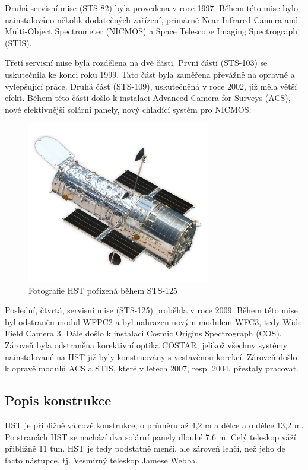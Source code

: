 \documentclass[a4paper,11pt]{article}
\begin{document}
Druhá servisní mise (STS-82) byla provedena v roce 1997. Během této mise bylo nainstalováno několik dodatečných zařízení, primárně Near Infrared Camera and Multi-Object Spectrometer (NICMOS) a Space Telescope Imaging Spectrograph (STIS).

Třetí servisní mise byla rozdělena na dvě části. První části (STS-103) se uskutečnila ke konci roku 1999. Tato část byla zaměřena převážně na opravné a vylepšující práce. Druhá část (STS-109), uskutečněná v roce 2002, již měla větší efekt. Během této části došlo k instalaci Advanced Camera for Surveys (ACS), nové efektivnější solární panely, nový chladící systém pro NICMOS.

\begin{figure}[h]
	\begin{center}
		\includegraphics[width=8cm]{HST-SM4.png}
		\caption{Fotografie HST pořízená během STS-125}
		\label{HST-SM4}
	\end{center}
\end{figure}

Poslední, čtvrtá, servisní mise (STS-125) proběhla v roce 2009. Během této mise byl odstraněn modul WFPC2 a byl nahrazen novým modulem WFC3, tedy Wide Field Camera 3. Dále došlo k instalaci Cosmic Origins Spectrograph (COS). Zároveň byla odstraněna korektivní optika COSTAR, jelikož všechny systémy nainstalované na HST již byly konstruovány s vestavěnou korekcí. Zároveň došlo k opravě modulů ACS a STIS, které v letech 2007, resp. 2004, přestaly pracovat.

\subsection{Popis konstrukce}

HST je přibližně válcové konstrukce, o průměru až 4,2 m a délce a o délce 13,2 m. Po stranách HST se nachází dva solární panely dlouhé 7,6 m. Celý teleskop váží přibližně 11 tun. HST je tedy podstatně menší, ale zároveň lehčí, než jeho de facto nástupce, tj. Vesmírný teleskop Jamese Webba.
\end{document}
